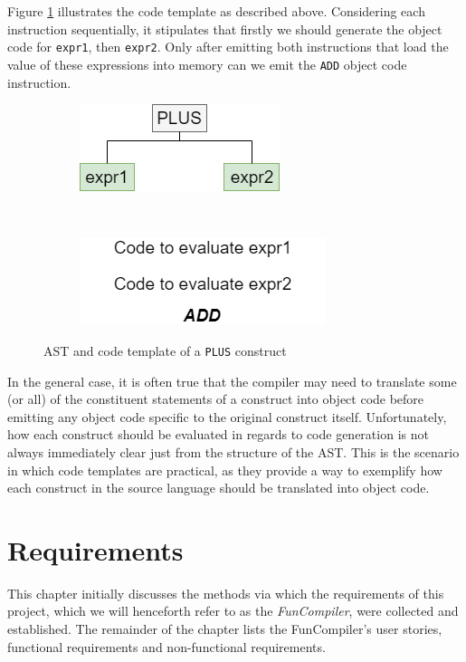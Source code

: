 \documentclass{l4proj}
\begin{document}
Figure \ref{fig:plus} illustrates the code template as described above. Considering each instruction sequentially, it stipulates that firstly we should generate the object code for \texttt{expr1}, then \texttt{expr2}. Only after emitting both instructions that load the value of these expressions into memory can we emit the \texttt{ADD} object code instruction. 

\begin{figure}[h]
	\centering
	\begin{subfigure}[b]{0.3\textwidth}
		\includegraphics[scale=0.65]{images/plus.png}
	\end{subfigure}
	~
	\begin{subfigure}[b]{0.3\textwidth}
		\includegraphics[scale=0.65]{images/plus-template.png}
	\end{subfigure}
	\caption{AST and code template of a \texttt{PLUS} construct}\label{fig:plus}	
\end{figure}

In the general case, it is often true that the compiler may need to translate some (or all) of the constituent statements of a construct into object code before emitting any object code specific to the original construct itself. Unfortunately, how each construct should be evaluated in regards to code generation is not always immediately clear just from the structure of the AST. This is the scenario in which code templates are practical, as they provide a way to exemplify how each construct in the source language should be translated into object code.

\chapter{Requirements}
This chapter initially discusses the methods via which the requirements of this project, which we will henceforth refer to as the \textit{FunCompiler}, were collected and established. The remainder of the chapter lists the FunCompiler's user stories, functional requirements and non-functional requirements.
\end{document}
